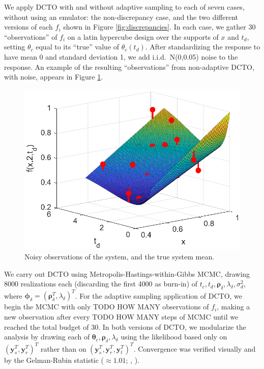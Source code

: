 \documentclass[12pt]{article}
\begin{document}
%
We apply DCTO with and without adaptive sampling to each of seven cases, without using an emulator: the non-discrepancy case, and the two different versions of each $f_i$ shown in Figure \ref{fig:discrepancies}.
%
In each case, we gather 30 ``observations'' of $f_i$ on a latin hypercube design over the supports of $x$ and $t_d$, setting $\theta_c$ equal to its ``true'' value of $\theta_c(t_d)$.
%
After standardizing the response to have mean 0 and standard deviation 1, we add i.i.d.\ N(0,0.05) noise to the response.
%
An example of the resulting ``observations'' from non-adaptive DCTO, with noise, appears in Figure \ref{fig:observed_data}.
%
\begin{figure}
	\centering
	\includegraphics[scale=0.85]{FIG_observed_data}
	\captionsetup{width=.85\linewidth}
	\caption{Noisy observations of the system, and the true system mean.}
	\label{fig:observed_data}
\end{figure}
%
We carry out DCTO using Metropolis-Hastings-within-Gibbs MCMC, drawing 8000 realizations each (discarding the first 4000 as burn-in) of $t_c,t_d,\boldsymbol\rho_{\delta},\lambda_{\delta},\sigma^2_d$, where $\boldsymbol\phi_\delta = (\boldsymbol\rho_\delta^T,\lambda_\delta)^T$.
%
For the adaptive sampling application of DCTO, we begin the MCMC with only TODO HOW MANY observations of $f_i$, making a new observation after every TODO HOW MANY steps of MCMC until we reached the total budget of 30.
%
In both versions of DCTO, we modularize the analysis by drawing each of $\boldsymbol\theta_c,\boldsymbol\rho_\delta,\lambda_\delta$ using the likelihood based only on $(\mathbf y_s^T,\mathbf y_r^T)^T$ rather than on $(\mathbf y_s^T,\mathbf y_r^T,\mathbf y_t^T)^T$.
%
Convergence was verified visually and by the Gelman-Rubin statistic ($\approx 1.01$; \citeauthor{Gelman1992a}, \citeyear{Gelman1992a}).
%
\end{document}
